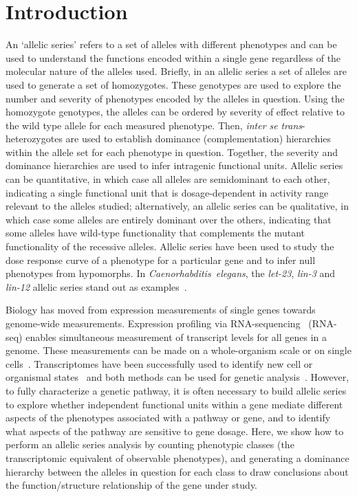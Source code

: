 \documentclass[10pt, twocolumn]{article}
\newcommand{\gene}[1]{\mbox{\emph{#1}}}
\begin{document}
\linenumbers{}
\section*{Introduction}
An `allelic series' refers to a set of alleles with different phenotypes and can
be used to understand the functions encoded within a single gene regardless of
the molecular nature of the alleles used. Briefly, in an allelic series a set of
alleles are used to generate a set of homozygotes. These genotypes are used to
explore the number and severity of phenotypes encoded by the alleles in
question. Using the homozygote genotypes, the alleles can be ordered by severity
of effect relative to the wild type allele for each measured phenotype. Then,
\emph{inter se} \emph{trans}-heterozygotes are used to establish dominance
(complementation) hierarchies within the allele set for each phenotype in
question. Together, the severity and dominance hierarchies are used to infer
intragenic functional units. Allelic series can be quantitative, in which case
all alleles are semidominant to each other, indicating a single functional unit
that is dosage-dependent in activity range relevant to the alleles studied;
alternatively, an allelic series can be qualitative, in which case some alleles
are entirely dominant over the others, indicating that some alleles have
wild-type functionality that complements the mutant functionality of the
recessive alleles. Allelic series have been used to study the dose response
curve of a phenotype for a particular gene and to infer null phenotypes from
hypomorphs. In \emph{Caenorhabditis~elegans}, the \gene{let-23}, \gene{lin-3}
and \gene{lin-12} allelic series stand out as
examples~\cite{Aroian1991,Ferguson1985a,Greenwald1983}.

Biology has moved from expression measurements of single genes towards
genome-wide measurements. Expression profiling via
RNA-sequencing~\cite{Mortazavi2008} (RNA-seq) enables simultaneous
measurement of transcript levels for all genes in a genome. These measurements
can be made on a whole-organism scale or on single
cells~\cite{Tang2009,Schwarz2012}. Transcriptomes have been successfully used to
identify new cell or organismal states~\cite{Angeles-Albores2017,Villani2017}
and  both methods can be used for genetic
analysis~\cite{Dixit2016,AngelesAlboresHIF}. However, to fully characterize a
genetic pathway, it is often necessary to build allelic series to explore
whether independent functional units within a gene mediate different aspects of
the phenotypes associated with a pathway or gene, and to identify what aspects
of the pathway are sensitive to gene dosage. Here, we show how to perform an
allelic series analysis by counting phenotypic classes (the transcriptomic
equivalent of observable phenotypes), and generating a dominance hierarchy
between the alleles in question for each class to draw conclusions about the
function/structure relationship of the gene under study.
\end{document}
